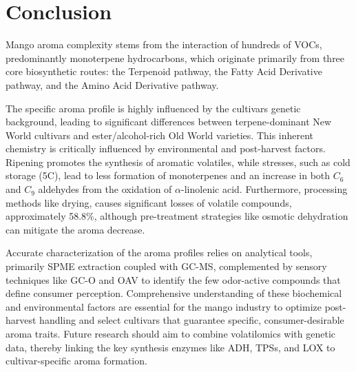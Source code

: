\section{Conclusion}
Mango aroma complexity stems from the interaction of hundreds of VOCs, predominantly monoterpene hydrocarbons, which originate primarily from three core biosynthetic routes: the Terpenoid pathway, the Fatty Acid Derivative pathway, and the Amino Acid Derivative pathway.

\vspace{1em}
The specific aroma profile is highly influenced by the cultivars genetic background, leading to significant differences between terpene-dominant New World cultivars and ester/alcohol-rich Old World varieties. This inherent chemistry is critically influenced by environmental and post-harvest factors. Ripening promotes the synthesis of aromatic volatiles, while stresses, such as cold storage (5\textdegree C), lead to less formation of monoterpenes and an increase in both $C_6$ and $C_9$ aldehydes from the oxidation of $\alpha$-linolenic acid. Furthermore, processing methods like drying, causes significant losses of volatile compounds, approximately 58.8\%, although pre-treatment strategies like osmotic dehydration can mitigate the aroma decrease.

\vspace{1em}
Accurate characterization of the aroma profiles relies on analytical tools, primarily SPME extraction coupled with GC-MS, complemented by sensory techniques like GC-O and OAV to identify the few odor-active compounds that define consumer perception. Comprehensive understanding of these biochemical and environmental factors are essential for the mango industry to optimize post-harvest handling and select cultivars that guarantee specific, consumer-desirable aroma traits. Future research should aim to combine volatilomics with genetic data, thereby linking the key synthesis enzymes like ADH, TPSs, and LOX to cultivar-specific aroma formation.
